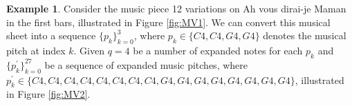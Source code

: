 \documentclass[11pt]{article}
\theoremstyle{definition}
\newtheorem{example}[theorem]{Example}
\begin{document}
\begin{example}
\label{ex: MV}
Consider the music piece 12 variations on Ah vous dirai-je Maman in the first bars, illustrated in Figure \ref{fig:MV1}. 
We can convert this musical sheet into a sequence $\{p_k\}_{k=0}^{3}$, where $p_k \in \{ C4, C4, G4, G4 \}$ denotes the musical pitch at index $k$.
Given $q = 4$ be a number of expanded notes for each $p_k$ and $\{p^\prime_k\}_{k=0}^{27}$ be a sequence of expanded music pitches, where $p^\prime_k \in \{ C4, C4, C4, C4, C4, C4, C4, C4, G4, G4, G4, G4, G4, G4, G4, G4 \}$, illustrated in Figure \ref{fig:MV2}.

\end{example}
\end{document}
